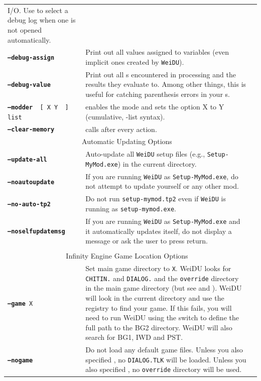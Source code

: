 \documentclass{article}
\def\ttref#1{\ahrefloc{#1}{\tt #1}}
\def\DEFINE#1{{\tt \bf #1}\label{#1}\index{#1}}
\def\t#1{{\tt #1}}
\def\Slist{{\color{red} list }}
\def\Ob{{\color{red} [ }}
\def\Oe{{\color{red} ] }}
\begin{document}
\begin{tabular}{lp{10in}|p{10in}}
I/O. Use \ttref{--log} to select a debug log when one is not opened
automatically. \\
\DEFINE{--debug-assign} & Print out all values assigned to \ttref{TP2}
variables (even implicit ones created by \t{WeiDU}). \\
\DEFINE{--debug-value} & Print out all \ttref{value}s encountered in
\ttref{TP2} processing and the results they evaluate to. Among other
things, this is useful for catching parenthesis errors in your
\ttref{value}s. \\
{\tt \DEFINE{--modder} \Ob X Y \Oe \Slist} & enables the
\ttref{MODDER} mode and sets the \ttref{MODDER} option X to Y (cumulative,
-list syntax).
\\
\DEFINE{--clear-memory} & calls \ttref{CLEAR_MEMORY} after every \ttref{TP2} action.
\\
\multicolumn{2}{c}{ \color{red} Automatic Updating Options } \\
\DEFINE{--update-all} & Auto-update all \t{WeiDU} setup files (e.g.,
\t{Setup-MyMod.exe}) in the current directory. \\
\DEFINE{--noautoupdate} & If you are running \t{WeiDU} as
\t{Setup-MyMod.exe}, do not attempt to update yourself or any other mod. \\
\DEFINE{--no-auto-tp2} & Do not run \t{setup-mymod.tp2} even if \t{WeiDU} is
running as \t{setup-mymod.exe}. \\
\DEFINE{--noselfupdatemsg} & If you are running \t{WeiDU} as
\t{Setup-MyMod.exe} and it automatically updates itself, do not display a
message or ask the user to press return. \\
\\
\multicolumn{2}{c}{ \color{red} Infinity Engine Game Location Options } \\
{\tt \DEFINE{--game} X	} & Set main game directory to {\tt X}. WeiDU looks for
{\tt CHITIN.}\ttref{KEY} and {\tt DIALOG.}\ttref{TLK} and the \t{override}
directory in the main game directory (but see \ttref{--tlkin} and
\ttref{--search}). WeiDU will look in the current directory and use the
registry to find your game. If this fails, you will need to run WeiDU using
the \ttref{--game} switch to define the full path to the BG2 directory.
WeiDU will also search for BG1, IWD and PST. \\
\DEFINE{--nogame}  & Do not
load any default game files. Unless you also specified \ttref{--tlkin}, no
\t{DIALOG.TLK} will be loaded. Unless you also specified \ttref{--search},
no \t{override} directory will be used. \\

\end{tabular}
\end{document}
